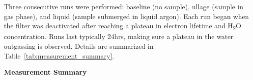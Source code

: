 \documentclass[12pt]{article}
\begin{document}
Three consecutive runs were performed: baseline (no sample), ullage (sample in gas phase), and liquid (sample submerged in liquid argon). Each run began when the filter was deactivated after reaching a plateau in electron lifetime and H\textsubscript{2}O concentration. Runs last typically 24hrs, making sure a plateau in the water outgassing is observed. Details are summarized in Table~\ref{tab:measurement_summary}.

\begin{table}[H]
    \centering
    \caption*{\textbf{Measurement Summary}}
    \renewcommand\arraystretch{1.5} %
    \renewcommand\arraystretch{1} %
    \vspace{0.3cm}
    \centering
    \caption{Summary of measurement results for each run. Systematic uncertainties are not included.}
    \vspace{0.1cm}
    \label{tab:measurement_summary}
\end{table}

\vspace{-1cm}
\end{document}
